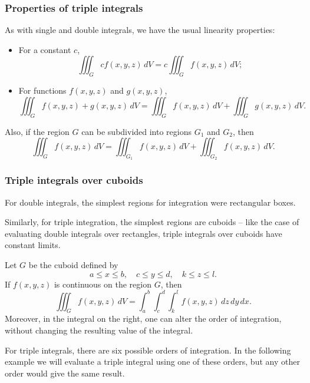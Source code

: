   \subsubsection*{Properties of triple integrals}

  As with single and double integrals, we have the usual linearity properties:
    \begin{itemize}
      \item For a constant $c$,
    \[
      \iiint_G cf(x, y, z) \, dV = c\iiint_G f(x, y, z) \, dV;
    \]
      \item For functions $f(x, y, z)$ and $g(x, y, z)$,
    \[
      \iiint_G f(x, y, z) + g(x, y, z) \, dV = \iiint_G f(x, y, z)\, dV + \iiint_G g(x, y, z) \, dV.
    \]
    \end{itemize}

  Also, if the region $G$ can be subdivided into regions $G_1$ and $G_2$, then
    \[
      \iiint_G f(x, y, z) \, dV = \iiint_{G_1} f(x, y, z) \, dV + \iiint_{G_2} f(x, y, z) \, dV.
    \]

  \subsubsection*{Triple integrals over cuboids}

  For double integrals, the simplest regions for integration were rectangular boxes.

  Similarly, for triple integration, the simplest regions are cuboids -- like the case of evaluating double integrals over rectangles, triple integrals over cuboids have constant limits.

  \begin{theorem}
    Let $G$ be the cuboid defined by
      \[
        a \leq x \leq b, \quad c \leq y \leq d, \quad k \leq z \leq l.
      \]
    If $f(x, y, z)$ is continuous on the region $G$, then
      \[
        \iiint_G f(x, y, z) \, dV = \int_a^b \int_c^d \int_k^l f(x, y, z) \, dz \, dy \, dx.
      \]
    Moreover, in the integral on the right, one can alter the order of integration, without changing the resulting value of the integral.
  \end{theorem}

  For triple integrals, there are six possible orders of integration.  In the following example we will evaluate a triple integral using one of these orders, but any other order would give the same result.

